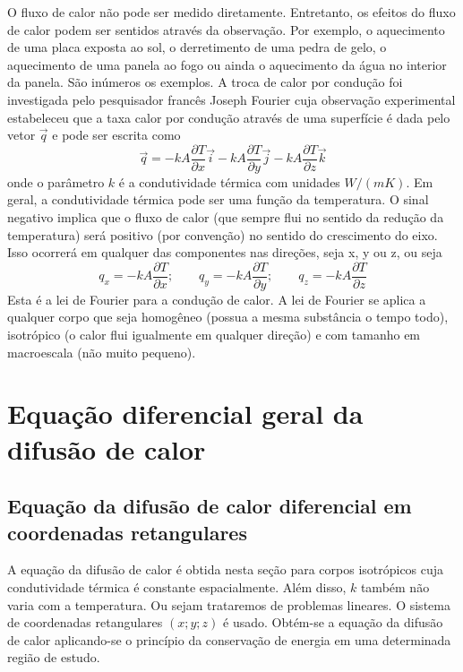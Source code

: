 O fluxo de calor não pode ser medido diretamente.  Entretanto, os efeitos do fluxo de calor podem ser sentidos através da observação. Por exemplo, o aquecimento de uma placa exposta ao sol, o derretimento de uma pedra de gelo, o aquecimento de uma panela ao fogo ou ainda o aquecimento da água no interior da panela. São inúmeros os exemplos. A troca de calor por condução foi investigada pelo pesquisador francês Joseph Fourier cuja observação experimental estabeleceu que a taxa  calor por condução através de uma superfície é dada pelo vetor $\vec{q}$ e pode ser escrita como
\begin{equation}\label{eq:vetorFluxoCalor}
	\vec{q}= -kA \frac{\partial{T}}{\partial{x}} \vec{i} 
	-kA \frac{\partial{T}}{\partial{y}} \vec{j}
	-kA \frac{\partial{T}}{\partial{z}} \vec{k} 
\end{equation}
onde o parâmetro $k$ é a condutividade térmica com unidades $W/(m K)$. Em geral, a condutividade térmica pode ser uma função da temperatura. O sinal negativo implica que o fluxo de calor (que sempre flui no sentido da redução da temperatura) será positivo (por convenção) no sentido do crescimento do eixo. Isso ocorrerá em qualquer das componentes nas direções, seja x, y ou z, ou seja 
\begin{equation}\label{eq:componentesFluxoCalor}
	q_x = -kA \frac{\partial{T}}{\partial{x}}; 
	\qquad  q_y = -kA \frac{\partial{T}}{\partial{y}}; 
	\qquad  q_z = -kA \frac{\partial{T}}{\partial{z}}   
\end{equation}
Esta é a lei de Fourier para a condução de calor. A lei de Fourier se aplica a qualquer corpo que seja homogêneo (possua a mesma substância o tempo todo), isotrópico (o calor flui igualmente em qualquer direção) e com tamanho em macroescala (não muito pequeno).

\section{Equação diferencial geral da difusão de calor} 

\subsection{Equação da difusão de calor diferencial em coordenadas retangulares} 

A equação da difusão de calor é obtida nesta seção para corpos isotrópicos cuja condutividade térmica é constante espacialmente. Além disso, $k$ também não varia com a temperatura. Ou sejam trataremos de problemas lineares. O sistema de coordenadas retangulares $(x; y; z)$ é usado. Obtém-se a equação da difusão de calor aplicando-se o princípio da conservação de energia em uma determinada região de estudo.

